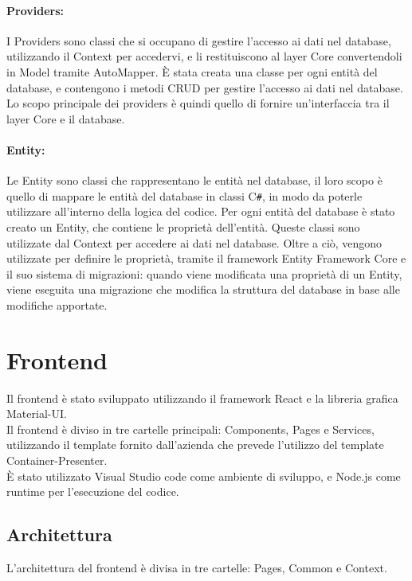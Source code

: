 \paragraph{Providers:}
I Providers sono classi che si occupano di gestire l'accesso ai dati nel database, utilizzando il Context per accedervi, e li restituiscono al layer Core convertendoli in Model tramite AutoMapper. È stata creata una classe per ogni entità del database, e contengono i metodi CRUD per gestire l'accesso ai dati nel database. Lo scopo principale dei providers è quindi quello di fornire un'interfaccia tra il layer Core e il database.\\

\paragraph{Entity:}
Le Entity sono classi che rappresentano le entità nel database, il loro scopo è quello di mappare le entità del database in classi C\texttt{\#}, in modo da poterle utilizzare all'interno della logica del codice. Per ogni entità del database è stato creato un Entity, che contiene le proprietà dell'entità. Queste classi sono utilizzate dal Context per accedere ai dati nel database. Oltre a ciò, vengono utilizzate per definire le proprietà, tramite il framework Entity Framework Core e il suo sistema di migrazioni: quando viene modificata una proprietà di un Entity, viene eseguita una migrazione che modifica la struttura del database in base alle modifiche apportate.\\

\section{Frontend}
Il frontend è stato sviluppato utilizzando il framework React e la libreria grafica Material-UI.\\
Il frontend è diviso in tre cartelle principali: Components, Pages e Services, utilizzando il template fornito dall'azienda che prevede l'utilizzo del template Container-Presenter.\\
È stato utilizzato Visual Studio code come ambiente di sviluppo, e Node.js come runtime per l'esecuzione del codice.\\

\subsection{Architettura}
L'architettura del frontend è divisa in tre cartelle: Pages, Common e Context.

